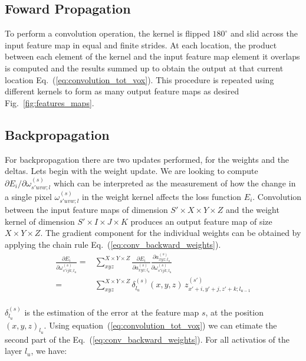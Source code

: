 \documentclass[final, paper=letter,5p,times,twocolumn]{elsarticle}
\begin{document}
\subsection{Foward Propagation}

To perform a convolution operation, the kernel is flipped $180^{\circ}$ and slid across the input feature map in equal and finite strides. At each location, the product between each element of the kernel and the input feature map element it overlaps is computed and the results summed up to obtain the output at that current location Eq.~(\ref{eq:convolution_tot_vox}). This procedure is repeated using different kernels to form as many output feature maps as desired Fig.~\ref{fig:features_maps}.

\subsection{Backpropagation}

For backpropagation there are two updates performed, for the weights and the deltas. Lets begin with the weight update. We are looking to compute $\partial E_{i} / \partial \omega_{s'uvw;l}^{(s)}$ which can be interpreted as the measurement of how the change in a single pixel $\omega_{s'uvw;l}^{(s)}$ in the weight kernel affects the loss function $E_{i}$. Convolution between the input feature maps of dimension $S' \times X \times Y \times Z$  and the weight kernel of dimension $S' \times I \times J \times K$ produces an output feature map of size $X \times Y \times Z$. The gradient component for the individual weights can be obtained by applying the chain rule Eq.~(\ref{eq:conv_backward_weights}).\\


\begin{equation}
  \begin{split}
    \frac{\partial E_{i}}{\partial \omega_{s'ijk;l_{u}}^{(s)}} =& \sum_{xyz}^{X \times Y \times Z} \frac{\partial E_{i}}{\partial a_{xyz;l_{u}}^{(s)}}\frac{\partial a_{xyz;l_{u}}^{(s)}}{\partial \omega_{s'ijk;l_{u}}^{(s)}}  \\
    =& \sum_{xyz}^{X \times Y \times Z} \delta_{l_{u}}^{(s)}(x,y,z) \, z_{x'+i,y'+j,z'+k;l_{u-1}}^{(s')} \\
  \end{split}
  \label{eq:conv_backward_weights} 
\end{equation}

$\delta_{l_{u}}^{(s)}$ is the estimation of the error at the feature map $s$, at the position $(x,y,z)_{l_{u}}$. Using equation~(\ref{eq:convolution_tot_vox}) we can etimate the second part of the Eq.~(\ref{eq:conv_backward_weights}). For all activatios of the layer $l_{u}$, we have:
\end{document}
